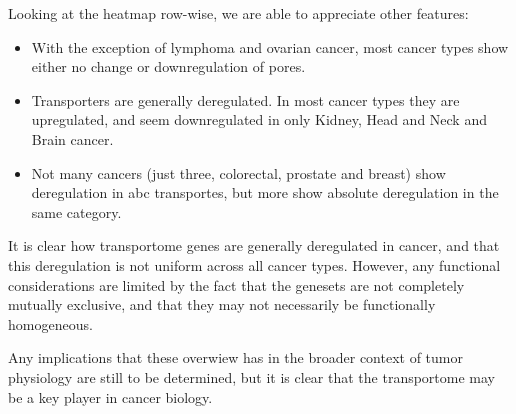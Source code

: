Looking at the heatmap row-wise, we are able to appreciate other features:
\begin{itemize}
    \item With the exception of lymphoma and ovarian cancer, most cancer types show either no change or downregulation of pores.
    \item Transporters are generally deregulated.
    In most cancer types they are upregulated, and seem downregulated in only Kidney, Head and Neck and Brain cancer.
    \item Not many cancers (just three, colorectal, prostate and breast) show deregulation in \gls{abc} transportes, but more show absolute deregulation in the same category.
\end{itemize}

It is clear how transportome genes are generally deregulated in cancer, and that this deregulation is not uniform across all cancer types.
However, any functional considerations are limited by the fact that the genesets are not completely mutually exclusive, and that they may not necessarily be functionally homogeneous.

Any implications that these overwiew has in the broader context of tumor physiology are still to be determined, but it is clear that the transportome may be a key player in cancer biology.
